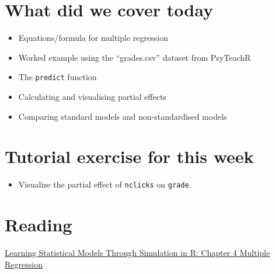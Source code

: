 \documentclass[
]{article}
\providecommand{\tightlist}{%
  \setlength{\itemsep}{0pt}\setlength{\parskip}{0pt}}
\begin{document}
\hypertarget{what-did-we-cover-today}{%
\section{What did we cover today}\label{what-did-we-cover-today}}

\begin{itemize}
\tightlist
\item
  Equations/formula for multiple regression
\item
  Worked example using the ``grades.csv'' dataset from PsyTeachR
\item
  The \texttt{predict} function
\item
  Calculating and visualising partial effects
\item
  Comparing standard models and non-standardised models
\end{itemize}

\hypertarget{tutorial-exercise-for-this-week}{%
\section{Tutorial exercise for this
week}\label{tutorial-exercise-for-this-week}}

\begin{itemize}
\tightlist
\item
  Visualize the partial effect of \texttt{nclicks} on \texttt{grade}.
\end{itemize}

\hypertarget{reading}{%
\section{Reading}\label{reading}}

\href{https://psyteachr.github.io/stat-models-v1/multiple-regression.html}{Learning
Statistical Models Through Simulation in R: Chapter 4 Multiple
Regression}
\end{document}
